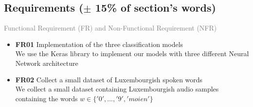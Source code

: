 \subsection{Requirements ($\pm$ 15\% of section's words)}

\textcolor{gray}{Functional Requirement (FR) and Non-Functional Requirement
  (NFR)}


\begin{itemize}
  \item \textbf{FR01} Implementation of the three classification models\\
    We use the Keras library to implement our models with three
    different Neural Network architecture
  \item \textbf{FR02} Collect a small dataset of Luxembourgish spoken words\\
    We collect a small dataset containing Luxembourgish audio samples containing
    the words $w \in \{'0',...,'9','moien'\}$
\end{itemize}
